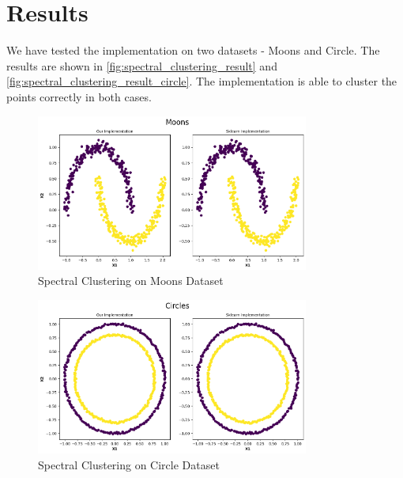 \documentclass{article}
\begin{document}
\section{Results}
\label{sec:results}
We have tested the implementation on two datasets - Moons and Circle. The results are shown in \autoref{fig:spectral_clustering_result} and \autoref{fig:spectral_clustering_result_circle}. The implementation is able to cluster the points correctly in both cases.

\begin{figure}[ht]
\centering
\includegraphics[width=0.8\textwidth]{images/moons_comp.png}
\caption{Spectral Clustering on Moons Dataset}
\label{fig:spectral_clustering_result}
\end{figure}

\begin{figure}[H]
\centering
\includegraphics[width=0.8\textwidth]{images/circle_comp.png}
\caption{Spectral Clustering on Circle Dataset}
\label{fig:spectral_clustering_result_circle}
\end{figure}
\end{document}
